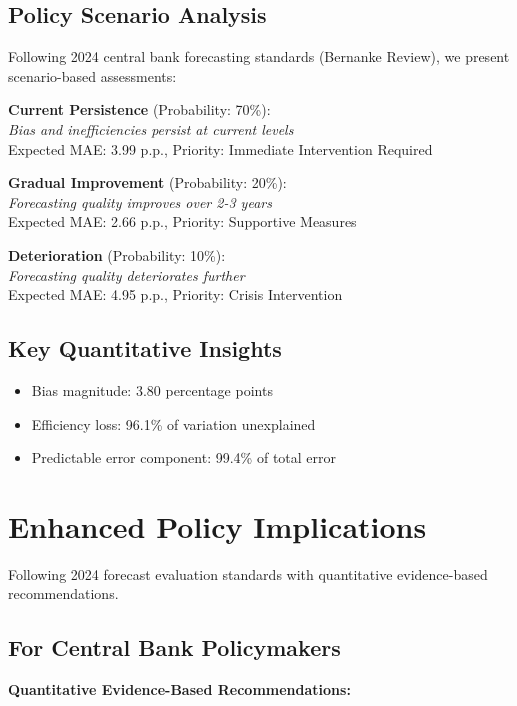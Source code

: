 \documentclass[11pt,a4paper]{article}
\begin{document}
\subsection{Policy Scenario Analysis}
Following 2024 central bank forecasting standards (Bernanke Review), we present scenario-based assessments:

\textbf{Current Persistence} (Probability: 70\%):\\
\textit{Bias and inefficiencies persist at current levels}\\
Expected MAE: 3.99 p.p., Priority: Immediate Intervention Required

\textbf{Gradual Improvement} (Probability: 20\%):\\
\textit{Forecasting quality improves over 2-3 years}\\
Expected MAE: 2.66 p.p., Priority: Supportive Measures

\textbf{Deterioration} (Probability: 10\%):\\
\textit{Forecasting quality deteriorates further}\\
Expected MAE: 4.95 p.p., Priority: Crisis Intervention

\subsection{Key Quantitative Insights}
\begin{itemize}
\item Bias magnitude: 3.80 percentage points
\item Efficiency loss: 96.1\% of variation unexplained
\item Predictable error component: 99.4\% of total error
\end{itemize}

\section{Enhanced Policy Implications}

Following 2024 forecast evaluation standards with quantitative evidence-based recommendations.

\subsection{For Central Bank Policymakers}
\textbf{Quantitative Evidence-Based Recommendations:}
\end{document}
